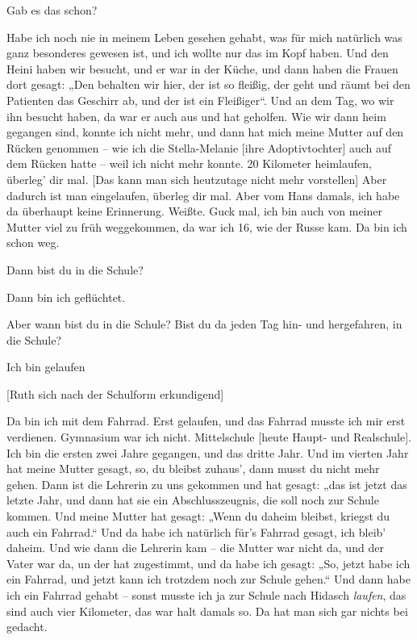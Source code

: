 \documentclass[ngerman,]{article}
\providecommand{\tightlist}{%
  \setlength{\itemsep}{0pt}\setlength{\parskip}{0pt}}
\begin{document}
\begin{multicols}{2}
\begin{description}
\tightlist
\item[Ruth]
Gab es das schon?
\item[Käthe]
Habe ich noch nie in meinem Leben gesehen gehabt, was für mich natürlich
was ganz besonderes gewesen ist, und ich wollte nur das im Kopf haben.
Und den Heini haben wir besucht, und er war in der Küche, und dann haben
die Frauen dort gesagt: „Den behalten wir hier, der ist so fleißig, der
geht und räumt bei den Patienten das Geschirr ab, und der ist ein
Fleißiger“. Und an dem Tag, wo wir ihn besucht haben, da war er auch aus
und hat geholfen. Wie wir dann heim gegangen sind, konnte ich nicht
mehr, und dann hat mich meine Mutter auf den Rücken genommen – wie ich
die Stella-Melanie {[}ihre Adoptivtochter{]} auch auf dem Rücken hatte –
weil ich nicht mehr konnte. 20 Kilometer heimlaufen, überleg' dir mal.
{[}Das kann man sich heutzutage nicht mehr vorstellen{]} Aber dadurch
ist man eingelaufen, überleg dir mal. Aber vom Hans damals, ich habe da
überhaupt keine Erinnerung. Weißte. Guck mal, ich bin auch von meiner
Mutter viel zu früh weggekommen, da war ich 16, wie der Russe kam. Da
bin ich schon weg.
\item[Ruth]
Dann bist du in die Schule?
\item[Käthe]
Dann bin ich geflüchtet.
\item[Ruth]
Aber wann bist du in die Schule? Bist du da jeden Tag hin- und
hergefahren, in die Schule?
\item[Käthe]
Ich bin gelaufen
\end{description}

{[}Ruth sich nach der Schulform erkundigend{]}

\begin{description}
\tightlist
\item[Käthe]
Da bin ich mit dem Fahrrad. Erst gelaufen, und das Fahrrad musste ich
mir erst verdienen. Gymnasium war ich nicht. Mittelschule {[}heute
Haupt- und Realschule{]}. Ich bin die ersten zwei Jahre gegangen, und
das dritte Jahr. Und im vierten Jahr hat meine Mutter gesagt, so, du
bleibst zuhaus', dann musst du nicht mehr gehen. Dann ist die Lehrerin
zu uns gekommen und hat gesagt: „das ist jetzt das letzte Jahr, und dann
hat sie ein Abschlusszeugnis, die soll noch zur Schule kommen. Und meine
Mutter hat gesagt: „Wenn du daheim bleibst, kriegst du auch ein
Fahrrad.“ Und da habe ich natürlich für's Fahrrad gesagt, ich bleib'
daheim. Und wie dann die Lehrerin kam – die Mutter war nicht da, und der
Vater war da, un der hat zugestimmt, und da habe ich gesagt: „So, jetzt
habe ich ein Fahrrad, und jetzt kann ich trotzdem noch zur Schule
gehen.“ Und dann habe ich ein Fahrrad gehabt – sonst musste ich ja zur
Schule nach Hidasch \emph{laufen}, das sind auch vier Kilometer, das war
halt damals so. Da hat man sich gar nichts bei gedacht.
\end{description}


\end{multicols}
\end{document}
